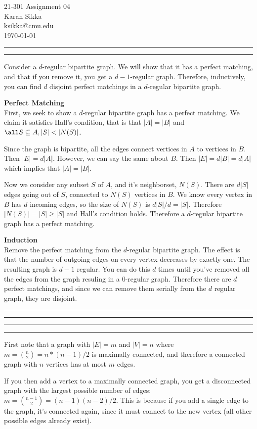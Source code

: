 \documentclass[11pt,letterpaper]{article}
\makeatletter
\newcommand{\question}[1] {\vspace{.25in} \hrule\vspace{0.5em}
\noindent{\bf #1} \vspace{0.5em}
\hrule \vspace{.10in}}
\newcommand{\myname}{Karan Sikka}
\newcommand{\myandrew}{ksikka@cmu.edu}
\newcommand{\myhwnum}{04}
\makeatother
\begin{document}
\medskip

\thispagestyle{plain}
\begin{center}                  %
{\Large 21-301 Assignment \myhwnum} \\
\myname \\
\myandrew \\
\today
\end{center}


\question{1}
Consider a $d$-regular bipartite graph. We will show that it has a perfect matching, and that if you remove it, you get a $d-1$-regular graph. Therefore, inductively, you can find $d$ disjoint perfect matchings in a $d$-regular bipartite graph.

\textbf{Perfect Matching}\\
First, we seek to show a $d$-regular bipartite graph has a perfect matching.
We claim it satisfies Hall's condition, that is that $|A| = |B|$ and
$\all S \subseteq A , |S| < |N(S)|$.

Since the graph is bipartite, all the edges connect vertices in $A$ to vertices in $B$.
Then $|E| = d|A|$. However, we can say the same about $B$.
Then $|E| = d|B| = d|A|$ which implies that $|A| = |B|$.

Now we consider any subset $S$ of $A$, and it's neighborset, $N(S)$.
There are $d|S|$ edges going out of $S$, connected to $N(S)$ vertices in $B$.
We know every vertex in $B$ has $d$ incoming edges, so the size of $N(S)$ is $d|S|/d = |S|$.
Therefore $|N(S)| = |S| \geq |S|$ and Hall's condition holds. Therefore a $d$-regular bipartite graph has a perfect matching.

\textbf{Induction}\\
Remove the perfect matching from the $d$-regular bipartite graph. The effect is that the number of outgoing edges on every vertex decreases by exactly one.
The resulting graph is $d-1$ regular. You can do this $d$ times until you've removed all the edges from the graph resuling in a 0-regular graph.
Therefore there are $d$ perfect matchings, and since we can remove them serially from the $d$ regular graph, they are disjoint.

\question{2}

\question{3}
First note that a graph with $|E| = m$ and $|V| = n$ where $m = {n \choose 2} = n*(n - 1)/2$ is maximally connected, and therefore a connected graph with $n$ vertices has at most $m$ edges.

If you then add a vertex to a maximally connected graph, you get a disconnected graph with the largest possible number of edges: $m = {n-1 \choose 2} = (n-1)(n-2)/2$.
This is because if you add a single edge to the graph, it's connected again, since it must connect to the new vertex (all other possible edges already exist).
\end{document}
